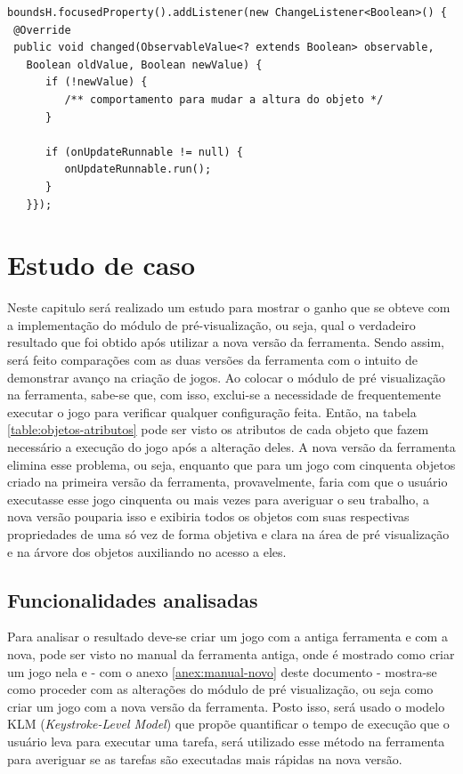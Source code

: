 \documentclass[12pt,oneside,openright,a4paper,english,brazil,sumario=tradicional]{abntex2}
\begin{document}
\begin{mylisting}[t]
\begin{lstlisting}
boundsH.focusedProperty().addListener(new ChangeListener<Boolean>() {
 @Override
 public void changed(ObservableValue<? extends Boolean> observable,
   Boolean oldValue, Boolean newValue) {
      if (!newValue) {
         /** comportamento para mudar a altura do objeto */
      }

      if (onUpdateRunnable != null) {
         onUpdateRunnable.run();
      }
   }});
\end{lstlisting}
\end{mylisting}


\label{chap:caso}
\chapter{Estudo de caso}

Neste capitulo será realizado um estudo para mostrar o ganho que se obteve com a implementação do módulo de pré-visualização, ou seja, qual o verdadeiro resultado que foi obtido após utilizar a nova versão da ferramenta. Sendo assim, será feito comparações com as duas versões da ferramenta com o intuito de demonstrar avanço na criação de jogos. Ao colocar o módulo de pré visualização na ferramenta, sabe-se que, com isso, exclui-se a necessidade de frequentemente executar o jogo para verificar qualquer configuração feita. Então, na tabela \ref{table:objetos-atributos} pode ser visto os atributos de cada objeto que fazem necessário a execução do jogo após a alteração deles. A nova versão da ferramenta elimina esse problema, ou seja, enquanto que para um jogo com cinquenta objetos criado na primeira versão da ferramenta, provavelmente, faria com que o usuário executasse esse jogo cinquenta ou mais vezes para averiguar o seu trabalho, a nova versão pouparia isso e exibiria todos os objetos com suas respectivas propriedades de uma só vez de forma objetiva e clara na área de pré visualização e na árvore dos objetos auxiliando no acesso a eles.

\section{Funcionalidades analisadas}

Para analisar o resultado deve-se criar um jogo com a antiga ferramenta e com a nova, pode ser visto no manual da ferramenta antiga, onde é mostrado como criar um jogo nela \cite{monografia:aquino} e - com o anexo \ref{anex:manual-novo} deste documento - mostra-se como proceder com as alterações do módulo de pré visualização, ou seja como criar um jogo com a nova versão da ferramenta. Posto isso, será usado o modelo KLM (\emph{Keystroke-Level Model}) que propõe quantificar o tempo de execução que o usuário leva para executar uma tarefa, será utilizado esse método na ferramenta para averiguar se as tarefas são executadas mais rápidas na nova versão.
\end{document}
